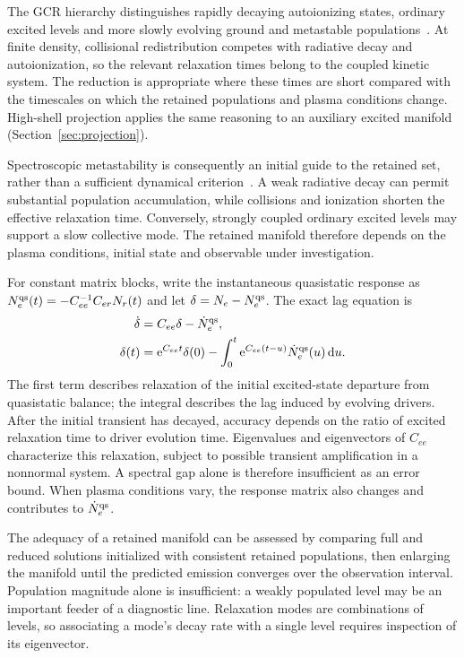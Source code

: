\documentclass[11pt,a4paper]{article}
\newcommand{\dd}{\mathrm{d}}
\newcommand{\ee}{\mathrm{e}}
\numberwithin{equation}{section}
\begin{document}
The GCR hierarchy distinguishes rapidly decaying autoionizing states,
ordinary excited levels and more slowly evolving ground and metastable
populations~\cite{summers2006}. At finite density, collisional
redistribution competes with radiative decay and autoionization, so
the relevant relaxation times belong to the coupled kinetic system.
The reduction is appropriate where these times are short compared with
the timescales on which the retained populations and plasma conditions
change. High-shell
projection applies the same reasoning to an auxiliary excited manifold
(Section~\ref{sec:projection}).

Spectroscopic metastability is consequently an initial guide to the
retained set, rather than a sufficient dynamical criterion~\cite{johnson}.
A weak radiative decay can permit substantial population accumulation,
while collisions and ionization shorten the effective relaxation time.
Conversely, strongly coupled ordinary excited levels may support a slow
collective mode. The retained manifold therefore depends on the plasma
conditions, initial state and observable under investigation.

For constant matrix blocks, write the instantaneous quasistatic response as
$N_e^{\rm qs}(t)=-C_{ee}^{-1}C_{er}N_r(t)$ and let
$\delta=N_e-N_e^{\rm qs}$. The exact lag equation is
\begin{align}
 \dot\delta&=C_{ee}\delta-\dot N_e^{\rm qs},\\
 \delta(t)&=\ee^{C_{ee}t}\delta(0)
       -\int_0^t\ee^{C_{ee}(t-u)}\dot N_e^{\rm qs}(u)\,\dd u.
       \label{eq:qs-lag}
\end{align}
The first term describes relaxation of the initial excited-state
departure from quasistatic balance; the integral describes the lag
induced by evolving drivers. After the initial transient has decayed,
accuracy depends on the ratio of excited relaxation time to driver
evolution time. Eigenvalues and eigenvectors of $C_{ee}$ characterize
this relaxation, subject to possible transient amplification in a
nonnormal system. A spectral gap alone is therefore insufficient as
an error bound. When plasma conditions vary, the response matrix also
changes and contributes to $\dot N_e^{\rm qs}$.

The adequacy of a retained manifold can be assessed by comparing full
and reduced solutions initialized with consistent retained populations,
then enlarging the manifold until the predicted emission converges over
the observation interval. Population magnitude alone is insufficient:
a weakly populated level may be an important feeder of a diagnostic
line. Relaxation modes are combinations of levels, so associating a
mode's decay rate with a single level requires inspection of its
eigenvector.
\end{document}
